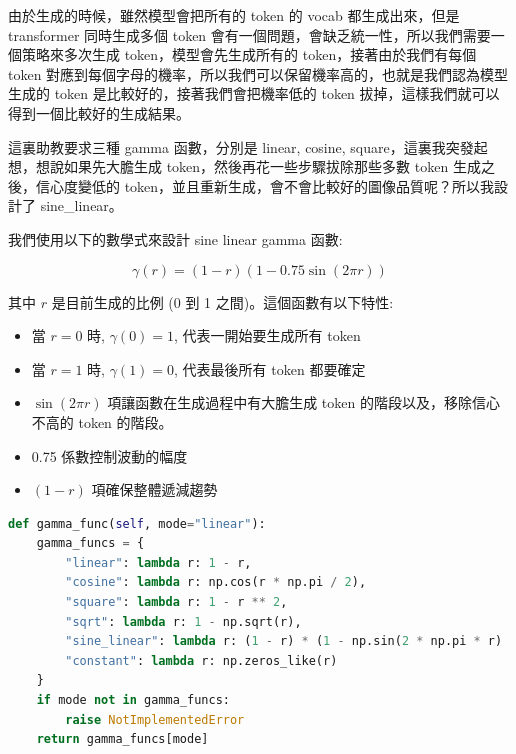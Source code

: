 由於生成的時候，雖然模型會把所有的 token 的 vocab 都生成出來，但是 transformer 同時生成多個 token 會有一個問題，會缺乏統一性，所以我們需要一個策略來多次生成 token，模型會先生成所有的 token，接著由於我們有每個 token 對應到每個字母的機率，所以我們可以保留機率高的，也就是我們認為模型生成的 token 是比較好的，接著我們會把機率低的 token 拔掉，這樣我們就可以得到一個比較好的生成結果。


這裏助教要求三種 gamma 函數，分別是 linear, cosine, square，這裏我突發起想，想說如果先大膽生成 token，然後再花一些步驟拔除那些多數 token 生成之後，信心度變低的 token，並且重新生成，會不會比較好的圖像品質呢？所以我設計了 sine\_linear。

我們使用以下的數學式來設計 sine linear gamma 函數:

\begin{equation}
    \gamma(r) = (1-r)(1-0.75\sin(2\pi r))
\end{equation}

其中 $r$ 是目前生成的比例 (0 到 1 之間)。這個函數有以下特性:

\begin{itemize}
    \item 當 $r=0$ 時, $\gamma(0)=1$, 代表一開始要生成所有 token
    \item 當 $r=1$ 時, $\gamma(1)=0$, 代表最後所有 token 都要確定
    \item $\sin(2\pi r)$ 項讓函數在生成過程中有大膽生成 token 的階段以及，移除信心不高的 token 的階段。
    \item 0.75 係數控制波動的幅度
    \item $(1-r)$ 項確保整體遞減趨勢
\end{itemize}



\begin{lstlisting}[language=Python, caption=Gamma 函數實作]
def gamma_func(self, mode="linear"): 
    gamma_funcs = {
        "linear": lambda r: 1 - r,
        "cosine": lambda r: np.cos(r * np.pi / 2),
        "square": lambda r: 1 - r ** 2,
        "sqrt": lambda r: 1 - np.sqrt(r),
        "sine_linear": lambda r: (1 - r) * (1 - np.sin(2 * np.pi * r)  *  0.75),
        "constant": lambda r: np.zeros_like(r)
    }
    if mode not in gamma_funcs:
        raise NotImplementedError
    return gamma_funcs[mode]
\end{lstlisting}


